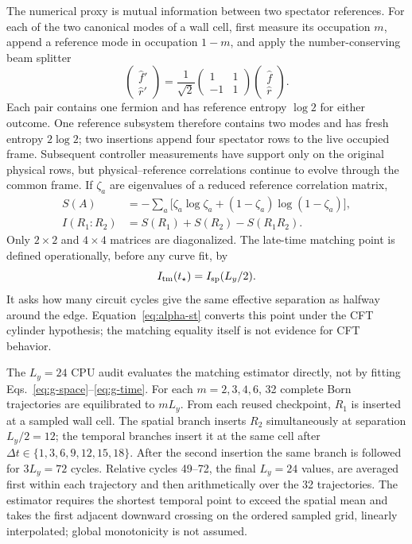\documentclass[aps,prx,twocolumn,superscriptaddress,longbibliography,nofootinbib,floatfix]{revtex4-2}
\begin{document}
The numerical proxy is mutual information between two spectator references.  For each of
the two canonical modes of a wall cell, first measure its occupation $m$, append a
reference mode in occupation $1-m$, and apply the number-conserving beam splitter
\begin{equation}
 \begin{pmatrix}\hat f'\\\hat r'\end{pmatrix}
 =\frac1{\sqrt2}\begin{pmatrix}1&1\\-1&1\end{pmatrix}
 \begin{pmatrix}\hat f\\\hat r\end{pmatrix}.
 \label{eq:beam-splitter}
\end{equation}
Each pair contains one fermion and has reference entropy $\log2$ for either outcome.  One
reference subsystem therefore contains two modes and has fresh entropy $2\log2$; two
insertions append four spectator rows to the live occupied frame.  Subsequent controller
measurements have support only on the original physical rows, but physical--reference
correlations continue to evolve through the common frame.  If $\zeta_a$ are eigenvalues
of a reduced reference correlation matrix,
\begin{align}
 S(A)&=-\sum_a\bigl[\zeta_a\log\zeta_a
 +(1-\zeta_a)\log(1-\zeta_a)\bigr],\nonumber\\
 I(R_1{:}R_2)&=S(R_1)+S(R_2)-S(R_1R_2).
 \label{eq:reference-mi}
\end{align}
Only $2\times2$ and $4\times4$ matrices are diagonalized.
The late-time matching point is defined operationally, before any curve fit, by
\begin{equation}
 I_{\rm tm}(t_\star)=I_{\rm sp}(L_y/2).
 \label{eq:mi-match}
\end{equation}
It asks how many circuit cycles give the same effective separation as halfway around the
edge.  Equation~\eqref{eq:alpha-st} converts this point under the CFT cylinder hypothesis;
the matching equality itself is not evidence for CFT behavior.

The $L_y=24$ CPU audit evaluates the matching estimator directly, not by fitting
Eqs.~\eqref{eq:g-space}--\eqref{eq:g-time}.  For each $m=2,3,4,6$, 32 complete Born
trajectories are equilibrated to $mL_y$.  From each reused checkpoint, $R_1$ is inserted
at a sampled wall cell.  The spatial branch inserts $R_2$ simultaneously at separation
$L_y/2=12$; the temporal branches insert it at the same cell after
$\Delta t\in\{1,3,6,9,12,15,18\}$.  After the second insertion the same branch is followed
for $3L_y=72$ cycles.  Relative cycles 49--72, the final $L_y=24$ values, are averaged
first within each trajectory and then arithmetically over the 32 trajectories.  The
estimator requires the shortest temporal point to exceed the spatial mean and takes the
first adjacent downward crossing on the ordered sampled grid, linearly interpolated;
global monotonicity is not assumed.
\end{document}
